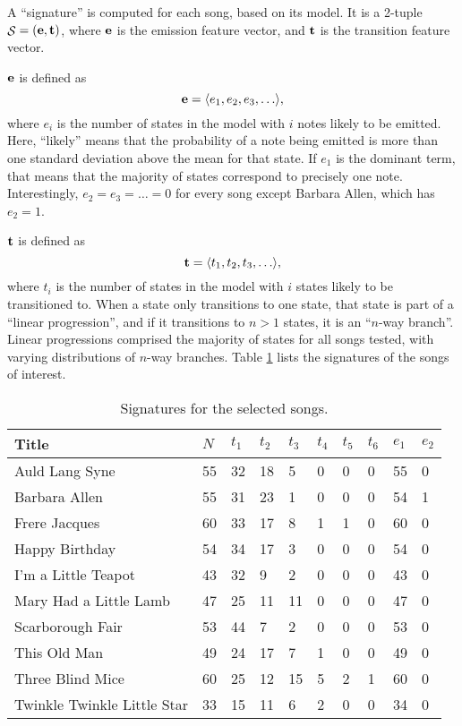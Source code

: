 \documentclass[12pt]{article}
\DeclareMathOperator{\signature}{\mathcal{S}}
\begin{document}
A ``signature'' is computed for each song, based on its model. It is a 2-tuple
$\signature = (\vb{e}, \vb{t})$, where $\vb{e}$ is the emission feature
vector, and $\vb{t}$ is the transition feature vector.

$\vb{e}$ is defined as
\begin{equation}
  \vb{e} = \langle e_1, e_2, e_3, \ldots \rangle,
\end{equation}
where $e_i$ is the number of states in the model with $i$ notes likely to be
emitted. Here, ``likely'' means that the probability of a note being emitted is
more than one standard deviation above the mean for that state. If $e_1$ is the
dominant term, that means that the majority of states correspond to precisely
one note. Interestingly, $e_2 = e_3 = \ldots = 0$ for every song except
Barbara Allen, which has $e_2 = 1$.

$\vb{t}$ is defined as
\begin{equation}
  \vb{t} = \langle t_1, t_2, t_3, \ldots \rangle,
\end{equation}
where $t_i$ is the number of states in the model with $i$ states likely to be
transitioned to. When a state only transitions to one state, that state
is part of a ``linear progression'', and if it transitions to $n > 1$ states,
it is an ``$n$-way branch''. Linear progressions comprised the majority of
states for all songs tested, with varying distributions of $n$-way branches.
Table \ref{tab:signatures} lists the signatures of the songs of interest.

\begin{table}[t]
\centering
\begin{tabular}{l||l|llllll|ll}
  \textbf{Title}
& $N$ & $t_1$ & $t_2$ & $t_3$ & $t_4$ & $t_5$ & $t_6$ & $e_1$ & $e_2$
\\\hline\hline
  Auld Lang Syne
& 55
& 32 & 18 & 5 & 0 & 0 & 0
& 55 & 0
\\
  Barbara Allen
& 55
& 31 & 23 & 1 & 0 & 0 & 0
& 54 & 1
\\
  Frere Jacques
& 60
& 33 & 17 & 8 & 1 & 1 & 0
& 60 & 0
\\
  Happy Birthday
& 54
& 34 & 17 & 3 & 0 & 0 & 0
& 54 & 0
\\
  I'm a Little Teapot
& 43
& 32 & 9 & 2 & 0 & 0 & 0
& 43 & 0
\\
  Mary Had a Little Lamb
& 47
& 25 & 11 & 11 & 0 & 0 & 0
& 47 & 0
\\
  Scarborough Fair
& 53
& 44 & 7 & 2 & 0 & 0 & 0
& 53 & 0
\\
  This Old Man
& 49
& 24 & 17 & 7 & 1 & 0 & 0
& 49 & 0
\\
  Three Blind Mice
& 60
& 25 & 12 & 15 & 5 & 2 & 1
& 60 & 0
\\
  Twinkle Twinkle Little Star
& 33
& 15 & 11 & 6 & 2 & 0 & 0
& 34 & 0
\end{tabular}
\caption{Signatures for the selected songs.}
\label{tab:signatures}
\end{table}
\end{document}
